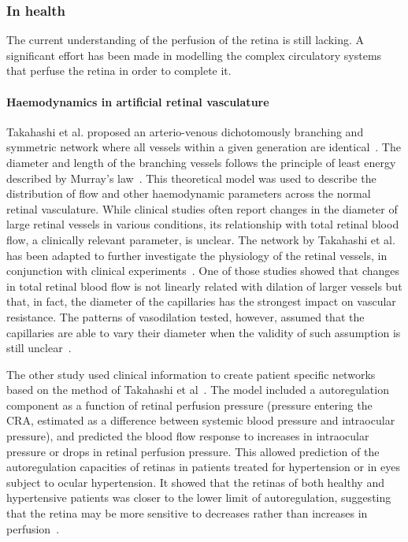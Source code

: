 \documentclass{article}
\begin{document}
\subsubsection{In health}

The current understanding of the perfusion of the retina is still lacking.
A significant effort has been made in modelling the complex circulatory systems that perfuse the retina in order to complete it.

\paragraph*{Haemodynamics in artificial retinal vasculature}

Takahashi et al. proposed an arterio-venous dichotomously branching and symmetric network where all vessels within a given generation are identical~\cite{Takahashi_2009}.
The diameter and length of the branching vessels follows the principle of least energy described by Murray's law~\cite{Murray_1926}.
This theoretical model was used to describe the distribution of flow and other haemodynamic parameters across the normal retinal vasculature.
While clinical studies often report changes in the diameter of large retinal vessels in various conditions, its relationship with total retinal blood flow, a clinically relevant parameter, is unclear.
The network by Takahashi et al. has been adapted to further investigate the physiology of the retinal vessels, in conjunction with clinical experiments~\cite{Aschinger_2017,Pappelis_2020}.
One of those studies showed that changes in total retinal blood flow is not linearly related with dilation of larger vessels but that, in fact, the diameter of the capillaries has the strongest impact on vascular resistance.
The patterns of vasodilation tested, however, assumed that the capillaries are able to vary their diameter when the validity of such assumption is still unclear~\cite{Kur_2012}.

The other study used clinical information to create patient specific networks based on the method of Takahashi et al~\cite{Pappelis_2020}.
The model included a autoregulation component as a function of retinal perfusion pressure (pressure entering the CRA, estimated as a difference between systemic blood pressure and intraocular pressure), and predicted the blood flow response to increases in intraocular pressure or drops in retinal perfusion pressure.
This allowed prediction of the autoregulation capacities of retinas in patients treated for hypertension or in eyes subject to ocular hypertension.
It showed that the retinas of both healthy and hypertensive patients was closer to the lower limit of autoregulation, suggesting that the retina may be more sensitive to decreases rather than increases in perfusion~\cite{Pappelis_2020}.
\end{document}
